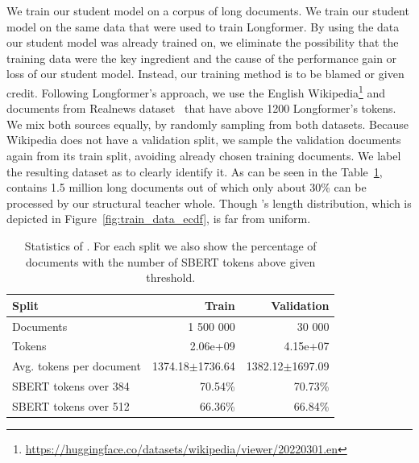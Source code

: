 We train our student model on a corpus of long documents. We train our student
model on the same data that were used to train Longformer. By using the data our
student model was already trained on, we eliminate the possibility that the
training data were the key ingredient and the cause of the performance gain or
loss of our student model. Instead, our training method is to be blamed or given
credit. Following Longformer's approach, we use the English
Wikipedia\footnote{\url{https://huggingface.co/datasets/wikipedia/viewer/20220301.en}}
and documents from Realnews dataset~\citep{zellers2019defending} that have above
1200 Longformer's tokens. We mix both sources equally, by randomly sampling from
     both datasets. Because Wikipedia does not have a validation split, we
     sample the validation documents again from its train split, avoiding
     already chosen training documents. We label the resulting dataset as
      to clearly identify it. As can be seen in the
     Table~\ref{table:train_data_stats},  contains 1.5
     million long documents out of which only about 30\% can be processed by our
     structural teacher whole. Though 's length
     distribution, which is depicted in Figure~\ref{fig:train_data_ecdf}, is far
     from uniform.

\begin{table}
    \centering
\begin{tabular}{lrr}
\toprule
Split & Train & Validation \\
\midrule
Documents & 1 500 000 & 30 000 \\
Tokens & 2.06e+09 & 4.15e+07 \\
Avg. tokens per document & 1374.18$\pm$1736.64 & 1382.12$\pm$1697.09 \\
SBERT tokens over 384 & 70.54\% & 70.73\% \\
SBERT tokens over 512 & 66.36\% & 66.84\% \\
\bottomrule
\end{tabular}

    \caption{Statistics of . For each split we also show
    the percentage of documents with the number of SBERT tokens above given
    threshold.}

    \label{table:train_data_stats}

\end{table}

